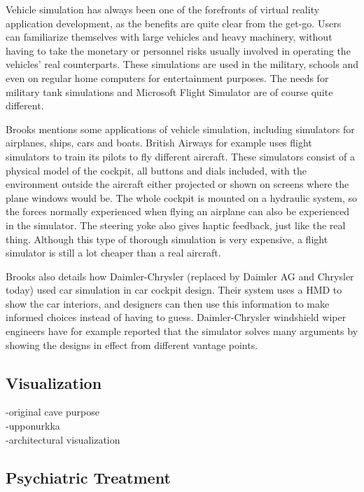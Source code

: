 \documentclass[12pt,a4paper,oneside,pdftex]{report}
\begin{document}
Vehicle simulation has always been one of the forefronts of virtual reality application development, as the benefits are quite clear from the get-go. Users can familiarize themselves with large vehicles and heavy machinery, without having to take the monetary or personnel risks usually involved in operating the vehicles' real counterparts. These simulations are used in the military, schools and even on regular home computers for entertainment purposes. The needs for military tank simulations and Microsoft Flight Simulator are of course quite different.

Brooks \cite{brooks1999whatsreal} mentions some applications of vehicle simulation, including simulators for airplanes, ships, cars and boats. British Airways for example uses flight simulators to train its pilots to fly different aircraft. These simulators consist of a physical model of the cockpit, all buttons and dials included, with the environment outside the aircraft either projected or shown on screens where the plane windows would be. The whole cockpit is mounted on a hydraulic system, so the forces normally experienced when flying an airplane can also be experienced in the simulator. The steering yoke also gives haptic feedback, just like the real thing. Although this type of thorough simulation is very expensive, a flight simulator is still a lot cheaper than a real aircraft.

Brooks also details how Daimler-Chrysler (replaced by Daimler AG and Chrysler today) used car simulation in car cockpit design. Their system uses a HMD to show the car interiors, and designers can then use this information to make informed choices instead of having to guess. Daimler-Chrysler windshield wiper engineers have for example reported that the simulator solves many arguments by showing the designs in effect from different vantage points.

\subsection{Visualization}
\label{subsection:applications:visualization}

-original cave purpose \\
-upponurkka \\
-architectural visualization

\subsection{Psychiatric Treatment}
\label{subsection:applications:psychiatric}
\end{document}
